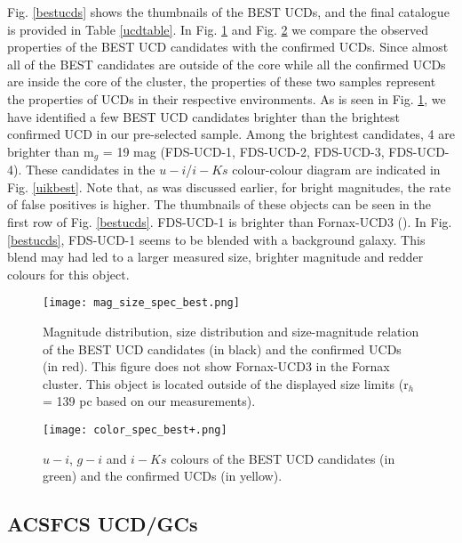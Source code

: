 \documentclass[fleqn,usenatbib]{mnras}
\begin{document}
Fig. \ref{bestucds} shows the thumbnails of the BEST UCDs, and the final catalogue is provided in Table \ref{ucdtable}. In Fig. \ref{magsizebest} and Fig. \ref{colorbest} we compare the observed properties of the BEST UCD candidates with the confirmed UCDs.
Since almost all of the BEST candidates are outside of the core while all the confirmed UCDs are inside the core of the cluster, the properties of these two samples represent the properties of UCDs in their respective environments. As is seen in Fig. \ref{magsizebest}, we have identified a few BEST UCD candidates brighter than the brightest confirmed UCD in our pre-selected sample. Among the brightest candidates, 4 are brighter than m$_g$ = 19 mag (FDS-UCD-1, FDS-UCD-2, FDS-UCD-3, FDS-UCD-4). These candidates in the $u-i$/$i-Ks$ colour-colour diagram are indicated in Fig. \ref{uikbest}. Note that, as was discussed earlier, for bright magnitudes, the rate of false positives is higher. 
The thumbnails of these objects can be seen in the first row of Fig. \ref{bestucds}. FDS-UCD-1 is brighter than Fornax-UCD3 (\citealp{drinkwater2000}). In Fig. \ref{bestucds}, FDS-UCD-1 seems to be blended with a background galaxy. This blend may had led to a larger measured size, brighter magnitude and redder colours for this object.

\begin{figure}
\texttt{[image: mag\_size\_spec\_best.png]}
\caption{Magnitude distribution, size distribution and size-magnitude relation of the BEST UCD candidates (in black) and the confirmed UCDs (in red). This figure does not show Fornax-UCD3 in the Fornax cluster. This object is located outside of the displayed size limits (r$_h$ = 139 pc based on our measurements).}
\label{magsizebest}
\end{figure}

\begin{figure}
\texttt{[image: color\_spec\_best+.png]}
\caption{$u-i$, $g-i$ and $i-Ks$ colours of the BEST UCD candidates (in green) and the confirmed UCDs (in yellow).}
\label{colorbest}
\end{figure}

\subsection{ACSFCS UCD/GCs}
\end{document}
